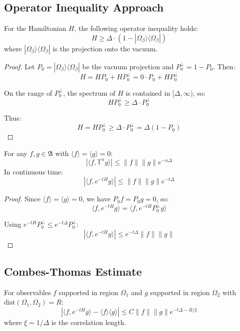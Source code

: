 \subsection{Operator Inequality Approach}

\begin{theorem}
\label{thm:operator-poincare}
For the Hamiltonian $H$, the following operator inequality holds:
\[
H \geq \Delta \cdot (1 - |\Omega_\beta\rangle\langle\Omega_\beta|)
\]
where $|\Omega_\beta\rangle\langle\Omega_\beta|$ is the projection onto the vacuum.
\end{theorem}

\begin{proof}
Let $P_0 = |\Omega_\beta\rangle\langle\Omega_\beta|$ be the vacuum projection and 
$P_0^\perp = 1 - P_0$. Then:
\[
H = H P_0 + H P_0^\perp = 0 \cdot P_0 + H P_0^\perp
\]

On the range of $P_0^\perp$, the spectrum of $H$ is contained in $[\Delta, \infty)$, so:
\[
H P_0^\perp \geq \Delta \cdot P_0^\perp
\]

Thus:
\[
H = H P_0^\perp \geq \Delta \cdot P_0^\perp = \Delta (1 - P_0)
\]
\end{proof}

\begin{corollary}
\label{cor:exp-decay-v2}
For any $f, g \in \mathfrak{A}$ with $\langle f \rangle = \langle g \rangle = 0$:
\[
|\langle f, \mathbb{T}^n g \rangle| \leq \|f\| \|g\| e^{-n\Delta}
\]
In continuous time:
\[
|\langle f, e^{-tH} g \rangle| \leq \|f\| \|g\| e^{-t\Delta}
\]
\end{corollary}

\begin{proof}
Since $\langle f \rangle = \langle g \rangle = 0$, we have $P_0 f = P_0 g = 0$, so:
\[
\langle f, e^{-tH} g \rangle = \langle f, e^{-tH} P_0^\perp g \rangle
\]

Using $e^{-tH} P_0^\perp \leq e^{-t\Delta} P_0^\perp$:
\[
|\langle f, e^{-tH} g \rangle| \leq e^{-t\Delta} \|f\| \|g\|
\]
\end{proof}

\subsection{Combes-Thomas Estimate}

\begin{theorem}
\label{thm:combes-thomas}
For observables $f$ supported in region $\Omega_1$ and $g$ supported in region 
$\Omega_2$ with $\text{dist}(\Omega_1, \Omega_2) = R$:
\[
|\langle f, e^{-tH} g \rangle - \langle f \rangle \langle g \rangle| \leq C \|f\| \|g\| e^{-t\Delta - R/\xi}
\]
where $\xi = 1/\Delta$ is the correlation length.
\end{theorem}

